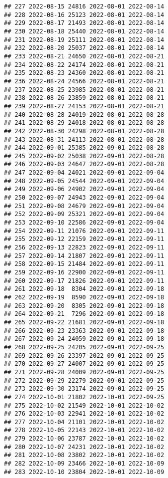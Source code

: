 \documentclass[
]{article}
\begin{document}
\begin{verbatim}
## 227 2022-08-15 24816 2022-08-01 2022-08-14
## 228 2022-08-16 25123 2022-08-01 2022-08-14
## 229 2022-08-17 21493 2022-08-01 2022-08-14
## 230 2022-08-18 25440 2022-08-01 2022-08-14
## 231 2022-08-19 25111 2022-08-01 2022-08-14
## 232 2022-08-20 25037 2022-08-01 2022-08-14
## 233 2022-08-21 24650 2022-08-01 2022-08-21
## 234 2022-08-22 24174 2022-08-01 2022-08-21
## 235 2022-08-23 24360 2022-08-01 2022-08-21
## 236 2022-08-24 24566 2022-08-01 2022-08-21
## 237 2022-08-25 23985 2022-08-01 2022-08-21
## 238 2022-08-26 23859 2022-08-01 2022-08-21
## 239 2022-08-27 24153 2022-08-01 2022-08-21
## 240 2022-08-28 24019 2022-08-01 2022-08-28
## 241 2022-08-29 24018 2022-08-01 2022-08-28
## 242 2022-08-30 24298 2022-08-01 2022-08-28
## 243 2022-08-31 24113 2022-08-01 2022-08-28
## 244 2022-09-01 25385 2022-09-01 2022-08-28
## 245 2022-09-02 25038 2022-09-01 2022-08-28
## 246 2022-09-03 24647 2022-09-01 2022-08-28
## 247 2022-09-04 24021 2022-09-01 2022-09-04
## 248 2022-09-05 24544 2022-09-01 2022-09-04
## 249 2022-09-06 24902 2022-09-01 2022-09-04
## 250 2022-09-07 24943 2022-09-01 2022-09-04
## 251 2022-09-08 24679 2022-09-01 2022-09-04
## 252 2022-09-09 25321 2022-09-01 2022-09-04
## 253 2022-09-10 22586 2022-09-01 2022-09-04
## 254 2022-09-11 21076 2022-09-01 2022-09-11
## 255 2022-09-12 22159 2022-09-01 2022-09-11
## 256 2022-09-13 22823 2022-09-01 2022-09-11
## 257 2022-09-14 21807 2022-09-01 2022-09-11
## 258 2022-09-15 21484 2022-09-01 2022-09-11
## 259 2022-09-16 22900 2022-09-01 2022-09-11
## 260 2022-09-17 21826 2022-09-01 2022-09-11
## 261 2022-09-18  8304 2022-09-01 2022-09-18
## 262 2022-09-19  8590 2022-09-01 2022-09-18
## 263 2022-09-20  8305 2022-09-01 2022-09-18
## 264 2022-09-21  7296 2022-09-01 2022-09-18
## 265 2022-09-22 21681 2022-09-01 2022-09-18
## 266 2022-09-23 23363 2022-09-01 2022-09-18
## 267 2022-09-24 24059 2022-09-01 2022-09-18
## 268 2022-09-25 24205 2022-09-01 2022-09-25
## 269 2022-09-26 23397 2022-09-01 2022-09-25
## 270 2022-09-27 24007 2022-09-01 2022-09-25
## 271 2022-09-28 24009 2022-09-01 2022-09-25
## 272 2022-09-29 22279 2022-09-01 2022-09-25
## 273 2022-09-30 23174 2022-09-01 2022-09-25
## 274 2022-10-01 21802 2022-10-01 2022-09-25
## 275 2022-10-02 21549 2022-10-01 2022-10-02
## 276 2022-10-03 22941 2022-10-01 2022-10-02
## 277 2022-10-04 21101 2022-10-01 2022-10-02
## 278 2022-10-05 22143 2022-10-01 2022-10-02
## 279 2022-10-06 23787 2022-10-01 2022-10-02
## 280 2022-10-07 24231 2022-10-01 2022-10-02
## 281 2022-10-08 23802 2022-10-01 2022-10-02
## 282 2022-10-09 23466 2022-10-01 2022-10-09
## 283 2022-10-10 23804 2022-10-01 2022-10-09

\end{verbatim}
\end{document}
